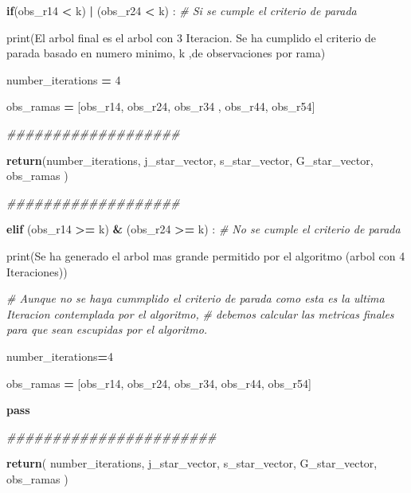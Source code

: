 \documentclass[
  11pt,
  a4paper,
]{article}
\newenvironment{Shaded}{\begin{snugshade}}{\end{snugshade}}
\newcommand{\BuiltInTok}[1]{#1}
\newcommand{\CommentTok}[1]{\textcolor[rgb]{0.56,0.35,0.01}{\textit{#1}}}
\newcommand{\ControlFlowTok}[1]{\textcolor[rgb]{0.13,0.29,0.53}{\textbf{#1}}}
\newcommand{\DecValTok}[1]{\textcolor[rgb]{0.00,0.00,0.81}{#1}}
\newcommand{\NormalTok}[1]{#1}
\newcommand{\OperatorTok}[1]{\textcolor[rgb]{0.81,0.36,0.00}{\textbf{#1}}}
\newcommand{\StringTok}[1]{\textcolor[rgb]{0.31,0.60,0.02}{#1}}
\begin{document}
\begin{Shaded}
\begin{Highlighting}[]
        \ControlFlowTok{if}\NormalTok{(obs\_r14 }\OperatorTok{\textless{}}\NormalTok{ k) }\OperatorTok{|}\NormalTok{ (obs\_r24 }\OperatorTok{\textless{}}\NormalTok{ k) : }\CommentTok{\# Si se cumple el criterio de parada}


            \BuiltInTok{print}\NormalTok{(}\StringTok{\textquotesingle{}El arbol final es el arbol con 3 Iteracion. Se ha cumplido el criterio de parada basado en numero minimo\textquotesingle{}}\NormalTok{, k ,}\StringTok{\textquotesingle{}de observaciones por rama\textquotesingle{}}\NormalTok{)}

\NormalTok{            number\_iterations }\OperatorTok{=} \DecValTok{4}
            
\NormalTok{            obs\_ramas }\OperatorTok{=}\NormalTok{ [obs\_r14, obs\_r24, obs\_r34 , obs\_r44, obs\_r54]}

            
            \CommentTok{\#\#\#\#\#\#\#\#\#\#\#\#\#\#\#\#\#\#\#}
            
            \ControlFlowTok{return}\NormalTok{(number\_iterations, j\_star\_vector, s\_star\_vector, G\_star\_vector, obs\_ramas ) }

            \CommentTok{\#\#\#\#\#\#\#\#\#\#\#\#\#\#\#\#\#\#\#}


        \ControlFlowTok{elif}\NormalTok{ (obs\_r14 }\OperatorTok{\textgreater{}=}\NormalTok{ k) }\OperatorTok{\&}\NormalTok{ (obs\_r24 }\OperatorTok{\textgreater{}=}\NormalTok{ k) : }\CommentTok{\# No se cumple el criterio de parada}

            \BuiltInTok{print}\NormalTok{(}\StringTok{\textquotesingle{}Se ha generado el arbol mas grande permitido por el algoritmo (arbol con 4 Iteraciones)\textquotesingle{}}\NormalTok{)}

        \CommentTok{\# Aunque no se haya cummplido el criterio de parada como esta es la ultima Iteracion contemplada por el algoritmo, }
        \CommentTok{\# debemos calcular las metricas finales para que sean escupidas por el algoritmo. }
            
\NormalTok{            number\_iterations}\OperatorTok{=}\DecValTok{4}
            
\NormalTok{            obs\_ramas }\OperatorTok{=}\NormalTok{ [obs\_r14, obs\_r24, obs\_r34, obs\_r44, obs\_r54]}

            
              
            \ControlFlowTok{pass}

    \CommentTok{\#\#\#\#\#\#\#\#\#\#\#\#\#\#\#\#\#\#\#\#\#\#\#}
        
   
    \ControlFlowTok{return}\NormalTok{( number\_iterations, j\_star\_vector, s\_star\_vector, G\_star\_vector, obs\_ramas ) }
\end{Highlighting}
\end{Shaded}
\end{document}
